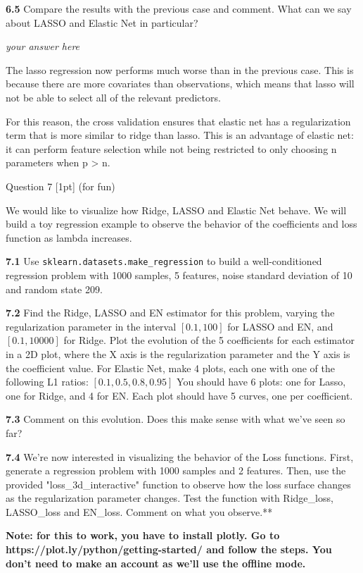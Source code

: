 \documentclass[11pt]{article}
\begin{document}
    \textbf{6.5} Compare the results with the previous case and comment.
What can we say about LASSO and Elastic Net in particular?

    \emph{your answer here}

The lasso regression now performs much worse than in the previous case.
This is because there are more covariates than observations, which means
that lasso will not be able to select all of the relevant predictors.

For this reason, the cross validation ensures that elastic net has a
regularization term that is more similar to ridge than lasso. This is an
advantage of elastic net: it can perform feature selection while not
being restricted to only choosing n parameters when p \textgreater{} n.

     Question 7 {[}1pt{]} (for fun)

We would like to visualize how Ridge, LASSO and Elastic Net behave. We
will build a toy regression example to observe the behavior of the
coefficients and loss function as lambda increases.

\textbf{7.1} Use \texttt{sklearn.datasets.make\_regression} to build a
well-conditioned regression problem with 1000 samples, 5 features, noise
standard deviation of 10 and random state 209.

\textbf{7.2} Find the Ridge, LASSO and EN estimator for this problem,
varying the regularization parameter in the interval \([0.1,100]\) for
LASSO and EN, and \([0.1,10000]\) for Ridge. Plot the evolution of the 5
coefficients for each estimator in a 2D plot, where the X axis is the
regularization parameter and the Y axis is the coefficient value. For
Elastic Net, make 4 plots, each one with one of the following L1 ratios:
\([0.1, 0.5, 0.8, 0.95]\) You should have 6 plots: one for Lasso, one
for Ridge, and 4 for EN. Each plot should have 5 curves, one per
coefficient.

\textbf{7.3} Comment on this evolution. Does this make sense with what
we've seen so far?

\textbf{7.4} We're now interested in visualizing the behavior of the
Loss functions. First, generate a regression problem with 1000 samples
and 2 features. Then, use the provided "loss\_3d\_interactive" function
to observe how the loss surface changes as the regularization parameter
changes. Test the function with Ridge\_loss, LASSO\_loss and EN\_loss.
Comment on what you observe.**

\textbf{Note: for this to work, you have to install plotly. Go to
https://plot.ly/python/getting-started/ and follow the steps. You don't
need to make an account as we'll use the offline mode.}
\end{document}
